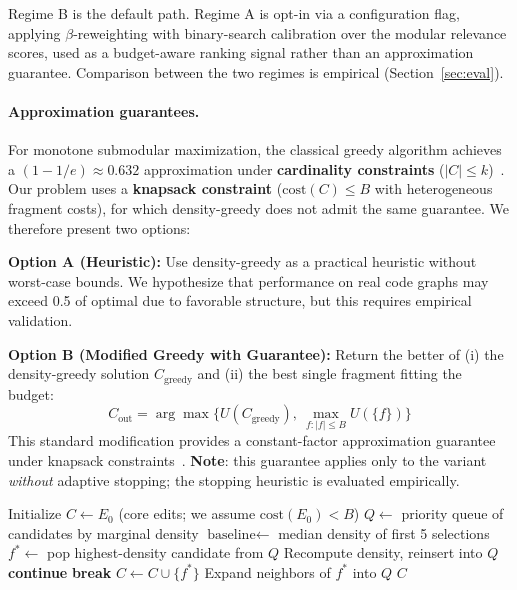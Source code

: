 \documentclass[11pt, a4paper]{article}
\begin{document}
Regime B is the default path. Regime A is opt-in via a configuration flag, applying $\beta$-reweighting with binary-search calibration over the modular relevance scores, used as a budget-aware ranking signal rather than an approximation guarantee. Comparison between the two regimes is empirical (Section~\ref{sec:eval}).

\paragraph{Approximation guarantees.} For monotone submodular maximization, the classical greedy algorithm achieves a $(1-1/e) \approx 0.632$ approximation under \textbf{cardinality constraints} ($|C| \leq k$)~\cite{nemhauser1978analysis}. Our problem uses a \textbf{knapsack constraint} ($\mathrm{cost}(C) \leq B$ with heterogeneous fragment costs), for which density-greedy does not admit the same guarantee. We therefore present two options:

\textbf{Option A (Heuristic):} Use density-greedy as a practical heuristic without worst-case bounds. We hypothesize that performance on real code graphs may exceed 0.5 of optimal due to favorable structure, but this requires empirical validation.

\textbf{Option B (Modified Greedy with Guarantee):} Return the better of (i) the density-greedy solution $C_{\text{greedy}}$ and (ii) the best single fragment fitting the budget:
\[
C_{\text{out}} = \arg\max\{U(C_{\text{greedy}}),\ \max_{f: |f| \leq B} U(\{f\})\}
\]
This standard modification provides a constant-factor approximation guarantee under knapsack constraints~\cite{khuller1999budgeted}. \textbf{Note}: this guarantee applies only to the variant \emph{without} adaptive stopping; the stopping heuristic is evaluated empirically.

\begin{algorithm}
\caption{Lazy Greedy Context Selection (Heuristic Version)}
\begin{algorithmic}[1]
\State Initialize $C \gets E_0$ (core edits; we assume $\mathrm{cost}(E_0) < B$)
\State $Q \gets$ priority queue of candidates by marginal density
\State $\text{baseline} \gets$ median density of first 5 selections
    \State $f^* \gets$ pop highest-density candidate from $Q$
        \State Recompute density, reinsert into $Q$
        \State \textbf{continue}
    \EndIf
        \State \textbf{break} 
    \EndIf
        \State $C \gets C \cup \{f^*\}$
        \State Expand neighbors of $f^*$ into $Q$
    \EndIf
\EndWhile
\State \Return $C$
\end{algorithmic}
\end{algorithm}
\end{document}
